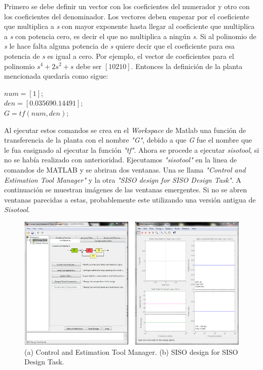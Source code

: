 \documentclass[a4paper,12pt,twoside]{proyectotanquesecci}
\begin{document}
Primero se debe definir un vector con los coeficientes del numerador y otro con los coeficientes del denominador. Los vectores deben empezar por el coeficiente que multiplica a \textit{s} con mayor exponente hasta llegar al coeficiente que multiplica a \textit{s} con potencia cero, es decir el que no multiplica a ningún \textit{s}. Si al polinomio de \textit{s} le hace falta alguna potencia de \textit{s} quiere decir que el coeficiente para esa potencia de \textit{s} es igual a cero. Por ejemplo, el vector de coeficientes para el polinomio $s^{4}+2s^{2}+s$ debe ser $[1 0 2 1 0]$.  Entonces la definición de la planta mencionada quedaría como sigue: \\

\begin{center}
$num=[1];$ \\
$den=[0.03569  0.1449  1];$ \\
$G=tf(num,den);$ \\
\end{center}

Al ejecutar estos comandos se crea en el \textit{Workspace} de Matlab una función de transferencia de la planta con el nombre \textit{"G"}, debido a que \textit{G} fue el nombre que le fua easignado al ejecutar la función \textit{"tf"}. Ahora se procede a ejecutar \textit{sisotool}, si no se había realizado con anterioridad. Ejecutamos \textit{"sisotool"} en la linea de comandos de MATLAB y se abriran dos ventanas. Una se llama \textit{"Control and Estimation Tool Manager"} y la otra \textit{"SISO design for SISO Design Task"}. A continuación se muestran imágenes de las ventanas emergentes. Si no se abren ventanas parecidas a estas, probablemente este utilizando una versión antigua de \textit{Sisotool}. \\

\begin{figure}[h]
\centering
\includegraphics[scale=0.5]{Ventana1}
\renewcommand{\figurename}{Fig.}
\caption{(a) Control and Estimation Tool Manager. (b) SISO design for SISO Design Task.}
\label{Control and Estimation Tool Manager.}
\end{figure}
\end{document}
